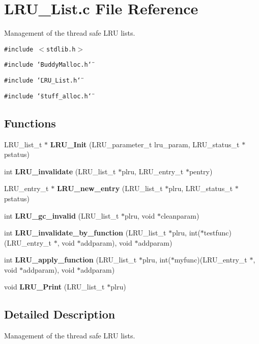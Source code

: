 \section{LRU\_\-List.c File Reference}
\label{LRU__List_8c}
Management of the thread safe LRU lists. 

{\tt \#include $<$stdlib.h$>$}\par
{\tt \#include \char`\"{}Buddy\-Malloc.h\char`\"{}}\par
{\tt \#include \char`\"{}LRU\_\-List.h\char`\"{}}\par
{\tt \#include \char`\"{}stuff\_\-alloc.h\char`\"{}}\par
\subsection*{Functions}
\begin{CompactItemize}
\item 
LRU\_\-list\_\-t $\ast$ {\bf LRU\_\-Init} (LRU\_\-parameter\_\-t lru\_\-param, LRU\_\-status\_\-t $\ast$pstatus)
\item 
int {\bf LRU\_\-invalidate} (LRU\_\-list\_\-t $\ast$plru, LRU\_\-entry\_\-t $\ast$pentry)
\item 
LRU\_\-entry\_\-t $\ast$ {\bf LRU\_\-new\_\-entry} (LRU\_\-list\_\-t $\ast$plru, LRU\_\-status\_\-t $\ast$pstatus)
\item 
int {\bf LRU\_\-gc\_\-invalid} (LRU\_\-list\_\-t $\ast$plru, void $\ast$cleanparam)
\item 
int {\bf LRU\_\-invalidate\_\-by\_\-function} (LRU\_\-list\_\-t $\ast$plru, int($\ast$testfunc)(LRU\_\-entry\_\-t $\ast$, void $\ast$addparam), void $\ast$addparam)
\item 
int {\bf LRU\_\-apply\_\-function} (LRU\_\-list\_\-t $\ast$plru, int($\ast$myfunc)(LRU\_\-entry\_\-t $\ast$, void $\ast$addparam), void $\ast$addparam)
\item 
void {\bf LRU\_\-Print} (LRU\_\-list\_\-t $\ast$plru)
\end{CompactItemize}


\subsection{Detailed Description}
Management of the thread safe LRU lists. 

